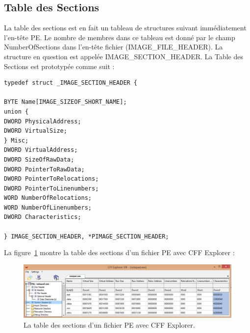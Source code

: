 \subsection{Table des Sections}
La table des sections est en fait un tableau de structures suivant immédiatement l'en-tête PE. Le nombre de membres dans ce tableau est donné par le champ NumberOfSections dans l'en-tête fichier (IMAGE\_FILE\_HEADER). La structure en question est appelée IMAGE\_SECTION\_HEADER. La Table des Sections est prototypée comme suit :
\begin{lstlisting}
typedef struct _IMAGE_SECTION_HEADER {

BYTE Name[IMAGE_SIZEOF_SHORT_NAME];
union {
DWORD PhysicalAddress;
DWORD VirtualSize;
} Misc;
DWORD VirtualAddress;
DWORD SizeOfRawData;
DWORD PointerToRawData;
DWORD PointerToRelocations;
DWORD PointerToLinenumbers;
WORD NumberOfRelocations;
WORD NumberOfLinenumbers;
DWORD Characteristics;

} IMAGE_SECTION_HEADER, *PIMAGE_SECTION_HEADER;

\end{lstlisting}
La figure~\ref{fig :pic6} montre la table des sections d'un fichier PE avec CFF Explorer :
\begin{figure}[H]
\begin{center}
\includegraphics[scale=0.5]{Figures/pic6.PNG}
\caption{ La table des sections d'un fichier PE avec CFF Explorer.}
\label{fig :pic6} 
\end{center}
\end{figure}


